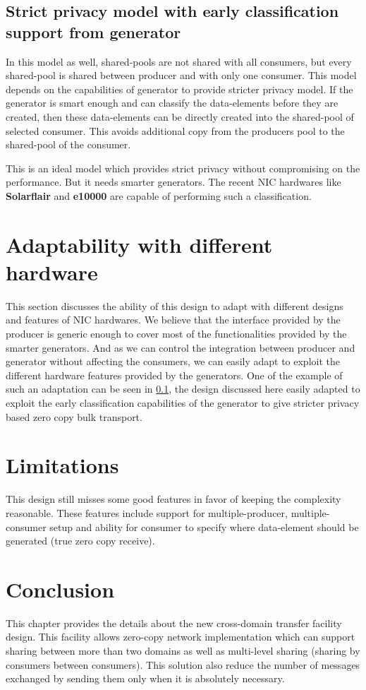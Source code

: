 \documentclass[a4paper,twoside]{report} %
\begin{document}
\subsection{Strict privacy model with early classification support
from generator}
\label{sec:generator-classification-privacy}
In this model as well, shared-pools are not shared with all 
consumers, but every shared-pool is shared between 
producer and with only one consumer. 
This model depends on the capabilities of generator to provide
stricter privacy model.  If the generator is smart enough and can 
classify the data-elements before they are created, then these
data-elements can be directly created into the shared-pool of selected
consumer.  This avoids additional copy from the producers pool to the
shared-pool of the consumer.

This is an ideal model which provides strict privacy without
compromising on the performance.  But it needs smarter generators.
The recent NIC hardwares like \textbf{Solarflair} and \textbf{e10000}
are capable of performing such a classification.


\section{Adaptability with different hardware}
This section discusses the ability of this design to
adapt with different designs and features of NIC hardwares.  
We believe that the interface
provided by the producer is generic enough to cover most of the
functionalities provided by the smarter generators.  And as we can
control the integration between producer and generator without affecting
the consumers, we can easily adapt to exploit the different hardware
features provided by the generators.  One of the example of such an
adaptation can be seen in \ref{sec:generator-classification-privacy},
the design discussed here easily adapted to exploit the early
classification capabilities of the generator to give stricter privacy
based zero copy bulk transport.

\section{Limitations}
This design still misses some good features in favor of keeping the
complexity reasonable.  These features include support for
multiple-producer, multiple-consumer setup and ability for consumer to
specify where data-element should be generated (true zero copy
receive).

\section{Conclusion}
This chapter provides the details about the new cross-domain transfer
facility design.  This facility allows zero-copy network
implementation which can support sharing between more than two domains
as well as multi-level sharing (sharing by consumers between
consumers).  This solution also reduce the number of messages
exchanged by sending them only when it is absolutely necessary.
\end{document}
